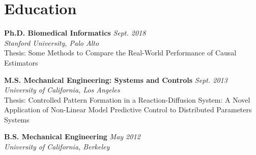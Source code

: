 \section{\mysidestyle Education}
    
    \textbf{Ph.D. Biomedical Informatics}     
    \hfill \textsl{Sept. 2018}  \\
    \textsl{Stanford University, Palo Alto}\\
    Thesis: Some Methods to Compare the Real-World Performance of Causal Estimators
    
    \textbf{M.S. Mechanical Engineering: Systems and Controls} 
    \hfill \textsl{Sept. 2013}  \\
    \textsl{University of California, Los Angeles} \\
    Thesis: Controlled Pattern Formation in a Reaction-Diffusion System: A Novel Application of Non-Linear Model Predictive Control to Distributed Parameters Systems
    
    \textbf{B.S. Mechanical Engineering} 
    \hfill \textsl{May 2012}  \\
    \textsl{University of California, Berkeley} 
